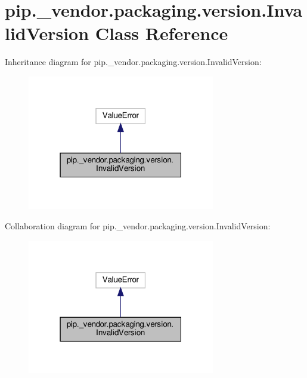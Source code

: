 \hypertarget{classpip_1_1__vendor_1_1packaging_1_1version_1_1InvalidVersion}{}\section{pip.\+\_\+vendor.\+packaging.\+version.\+Invalid\+Version Class Reference}
\label{classpip_1_1__vendor_1_1packaging_1_1version_1_1InvalidVersion}


Inheritance diagram for pip.\+\_\+vendor.\+packaging.\+version.\+Invalid\+Version\+:
\nopagebreak
\begin{figure}[H]
\begin{center}
\leavevmode
\includegraphics[width=232pt]{classpip_1_1__vendor_1_1packaging_1_1version_1_1InvalidVersion__inherit__graph}
\end{center}
\end{figure}


Collaboration diagram for pip.\+\_\+vendor.\+packaging.\+version.\+Invalid\+Version\+:
\nopagebreak
\begin{figure}[H]
\begin{center}
\leavevmode
\includegraphics[width=232pt]{classpip_1_1__vendor_1_1packaging_1_1version_1_1InvalidVersion__coll__graph}
\end{center}
\end{figure}


